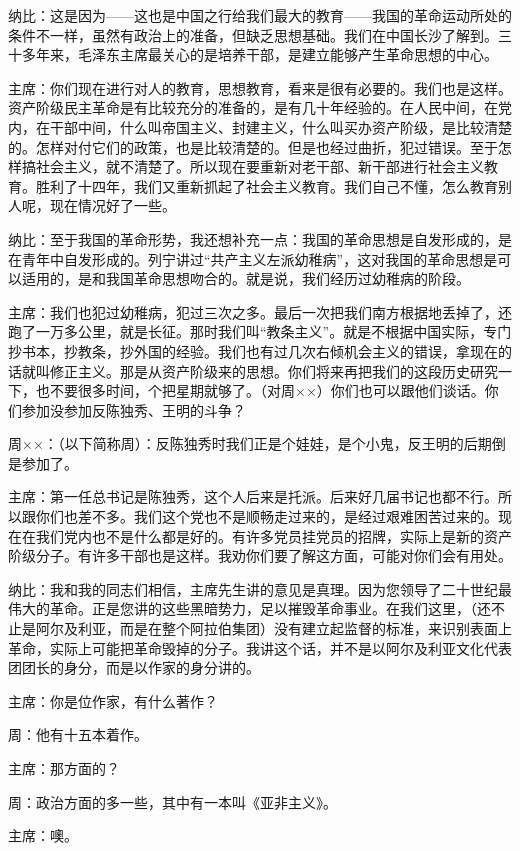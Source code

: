 纳比：这是因为——这也是中国之行给我们最大的教育——我国的革命运动所处的条件不一样，虽然有政治上的准备，但缺乏思想基础。我们在中国长沙了解到。三十多年来，毛泽东主席最关心的是培养干部，是建立能够产生革命思想的中心。

主席：你们现在进行对人的教育，思想教育，看来是很有必要的。我们也是这样。资产阶级民主革命是有比较充分的准备的，是有几十年经验的。在人民中间，在党内，在干部中间，什么叫帝国主义、封建主义，什么叫买办资产阶级，是比较清楚的。怎样对付它们的政策，也是比较清楚的。但是也经过曲折，犯过错误。至于怎样搞社会主义，就不清楚了。所以现在要重新对老干部、新干部进行社会主义教育。胜利了十四年，我们又重新抓起了社会主义教育。我们自己不懂，怎么教育别人呢，现在情况好了一些。

纳比：至于我国的革命形势，我还想补充一点：我国的革命思想是自发形成的，是在青年中自发形成的。列宁讲过“共产主义左派幼稚病”，这对我国的革命思想是可以适用的，是和我国革命思想吻合的。就是说，我们经历过幼稚病的阶段。

主席：我们也犯过幼稚病，犯过三次之多。最后一次把我们南方根据地丢掉了，还跑了一万多公里，就是长征。那时我们叫“教条主义”。就是不根据中国实际，专门抄书本，抄教条，抄外国的经验。我们也有过几次右倾机会主义的错误，拿现在的话就叫修正主义。那是从资产阶级来的思想。你们将来再把我们的这段历史研究一下，也不要很多时间，个把星期就够了。（对周××）你们也可以跟他们谈话。你们参加没参加反陈独秀、王明的斗争？

周××：（以下简称周）：反陈独秀时我们正是个娃娃，是个小鬼，反王明的后期倒是参加了。

主席：第一任总书记是陈独秀，这个人后来是托派。后来好几届书记也都不行。所以跟你们也差不多。我们这个党也不是顺畅走过来的，是经过艰难困苦过来的。现在在我们党内也不是什么都是好的。有许多党员挂党员的招牌，实际上是新的资产阶级分子。有许多干部也是这样。我劝你们要了解这方面，可能对你们会有用处。

纳比：我和我的同志们相信，主席先生讲的意见是真理。因为您领导了二十世纪最伟大的革命。正是您讲的这些黑暗势力，足以摧毁革命事业。在我们这里，（还不止是阿尔及利亚，而是在整个阿拉伯集团）没有建立起监督的标准，来识别表面上革命，实际上可能把革命毁掉的分子。我讲这个话，并不是以阿尔及利亚文化代表团团长的身分，而是以作家的身分讲的。

主席：你是位作家，有什么著作？

周：他有十五本着作。

主席：那方面的？

周：政治方面的多一些，其中有一本叫《亚非主义》。

主席：噢。

